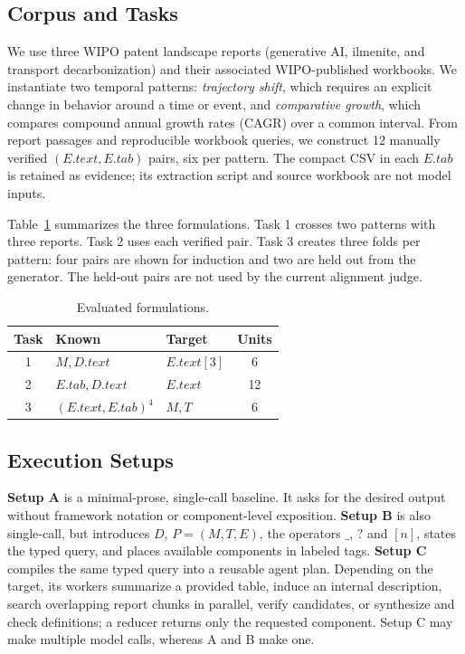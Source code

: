 \documentclass[sigconf,nonacm,anonymous]{acmart}
\begin{document}
\subsection{Corpus and Tasks}
We use three WIPO patent landscape reports (generative AI, ilmenite, and transport decarbonization) and their associated WIPO-published workbooks. We instantiate two temporal patterns: \emph{trajectory shift}, which requires an explicit change in behavior around a time or event, and \emph{comparative growth}, which compares compound annual growth rates (CAGR) over a common interval. From report passages and reproducible workbook queries, we construct 12 manually verified $(E.text,E.tab)$ pairs, six per pattern. The compact CSV in each $E.tab$ is retained as evidence; its extraction script and source workbook are not model inputs.

Table~\ref{tab:eval-tasks} summarizes the three formulations. Task 1 crosses two patterns with three reports. Task 2 uses each verified pair. Task 3 creates three folds per pattern: four pairs are shown for induction and two are held out from the generator. The held-out pairs are not used by the current alignment judge.

\begin{table}[t]
\centering
\small
\setlength{\tabcolsep}{3.5pt}
\caption{Evaluated formulations.}
\label{tab:eval-tasks}
\begin{tabular}{cllc}
\toprule
\textbf{Task} & \textbf{Known} & \textbf{Target} & \textbf{Units} \\
\midrule
1 & $M,D.text$ & $E.text[3]$ & 6 \\
2 & $E.tab,D.text$ & $E.text$ & 12 \\
3 & $(E.text,E.tab)^4$ & $M,T$ & 6 \\
\bottomrule
\end{tabular}
\end{table}

\subsection{Execution Setups}
\textbf{Setup A} is a minimal-prose, single-call baseline. It asks for the desired output without framework notation or component-level exposition. \textbf{Setup B} is also single-call, but introduces $D$, $P=(M,T,E)$, the operators $\_$, $?$ and $[n]$, states the typed query, and places available components in labeled tags. \textbf{Setup C} compiles the same typed query into a reusable agent plan. Depending on the target, its workers summarize a provided table, induce an internal description, search overlapping report chunks in parallel, verify candidates, or synthesize and check definitions; a reducer returns only the requested component. Setup C may make multiple model calls, whereas A and B make one.
\end{document}
